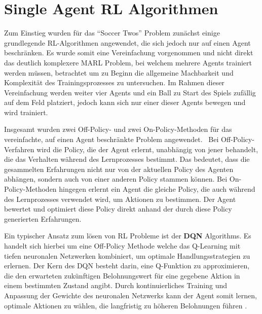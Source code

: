 \section{Single Agent RL Algorithmen}

Zum Einstieg wurden für das ``Soccer Twos'' Problem zunächst einige grundlegende \ac{RL}-Algorithmen angewendet, die sich jedoch nur auf einen Agent beschränken. Es wurde somit eine Vereinfachung vorgenommen und nicht direkt das deutlich komplexere \ac{MARL} Problem, bei welchem mehrere Agents trainiert werden müssen, betrachtet um zu Beginn die allgemeine Machbarkeit und Komplexität des Trainingsprozesses zu untersuchen. Im Rahmen dieser Vereinfachung werden weiter vier Agents und ein Ball zu Start des Spiels zufällig auf dem Feld platziert, jedoch kann sich nur einer dieser Agents bewegen und wird trainiert. 

Insgesamt wurden zwei Off-Policy- und zwei On-Policy-Methoden für das vereinfachte, auf einen Agent beschränkte Problem angewendet. 
Bei Off-Policy-Verfahren wird die Policy, die der Agent erlernt, unabhängig von jener behandelt, die das Verhalten während des Lernprozesses bestimmt. Das bedeutet, dass die gesammelten Erfahrungen nicht nur von der aktuellen Policy des Agenten abhängen, sondern auch von einer anderen Policy stammen können.
Bei On-Policy-Methoden hingegen erlernt ein Agent die gleiche Policy, die auch während des Lernprozesses verwendet wird, um Aktionen zu bestimmen. Der Agent bewertet und optimiert diese Policy direkt anhand der durch diese Policy generierten Erfahrungen.

Ein typischer Ansatz zum lösen von \ac{RL} Probleme ist der \textbf{\ac{DQN}} Algorithms. Es handelt sich hierbei um eine Off-Policy Methode welche das Q-Learning mit tiefen neuronalen Netzwerken kombiniert, um optimale Handlungsstrategien zu erlernen. Der Kern des \ac{DQN} besteht darin, eine Q-Funktion zu approximieren, die den erwarteten zukünftigen Belohnungswert für eine gegebene Aktion in einem bestimmten Zustand angibt. %
Durch kontinuierliches Training und Anpassung der Gewichte des neuronalen Netzwerks kann der Agent somit lernen, optimale Aktionen zu wählen, die langfristig zu höheren Belohnungen führen \cite{mnih2013}. 

